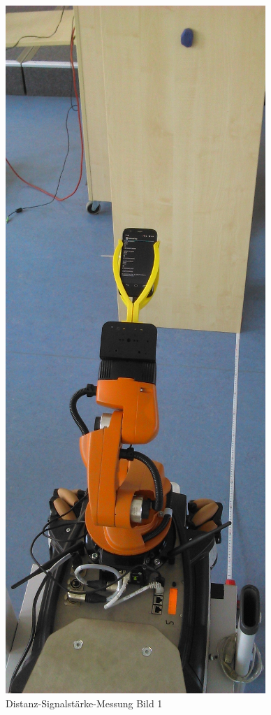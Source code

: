 \begin{figure}[H] 
\centering
\includegraphics[scale=0.3]{Bilder/MessungDistanz1}
\caption{Distanz-Signalstärke-Messung Bild 1}
\label{fig:MessungDistanz1}
\end{figure}
